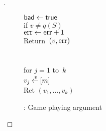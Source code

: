 \begin{proof}[]
\begin{figure}
{{\nudge $\mathsf{bad} \gets \mathsf{true}$\\
if $v \neq q(S)$\\
\nudge $\mathrm{err} \gets\mathrm{err} +1$\\
Return~$(v,\mathrm{err} )$\\\\
%
\\
for $j = 1$ to~$k$\\
\nudge $v_j {\:\stackrel{{\scriptscriptstyle \hspace{0.2em}\$}} {\leftarrow}\:} [m]$\\
Ret $\left(v_1,\ldots,v_k\right)$
}
}
\caption{: Game playing argument}\label{fig:3TGame}
\end{figure}


\end{proof}
